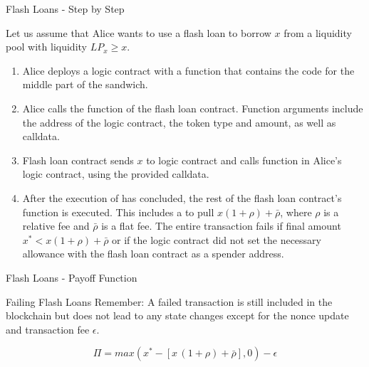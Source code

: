 \documentclass[handout]{beamer}
\begin{document}
\begin{frame}{Flash Loans - Step by Step}

\small

Let us assume that Alice wants to use a flash loan to borrow $x$ from a liquidity pool with liquidity $LP_x \geq x$. \\

\begin{enumerate}
	\item<2->[1.] Alice deploys a logic contract with a  function that contains the code for the middle part of the sandwich. %
	\item<3->[2a.] Alice calls the  function of the flash loan contract. Function arguments include the address of the logic contract, the token type and amount, as well as calldata.
	\item<4->[2b.] Flash loan contract sends $x$ to logic contract and calls  function in Alice's logic contract, using the provided calldata.
	\item<5->[2c.] After the execution of  has concluded, the rest of the flash loan contract's  function is executed. This includes a  to pull $x(1+\rho)+\bar{\rho}$, where $\rho$ is a relative fee and $\bar{\rho}$ is a flat fee. The entire transaction fails if final amount $x^* < x(1+\rho)+\bar{\rho}$ or if the logic contract did not set the necessary allowance with the flash loan contract as a spender address.
\end{enumerate}

\end{frame}


\begin{frame}{Flash Loans - Payoff Function}

\begin{keytakeaway}{Failing Flash Loans}
		Remember: A failed transaction is still included in the blockchain but does not lead to any state changes except for the nonce update and transaction fee $\epsilon$. 
\end{keytakeaway}

\vspace{0.5 em}

\small{
\begin{equation*}
	\Pi = max (x^{\ast}-[x \,(1+\rho) + \bar{\rho} ],0) - \epsilon
\end{equation*}
}

	
\end{frame}
\end{document}
